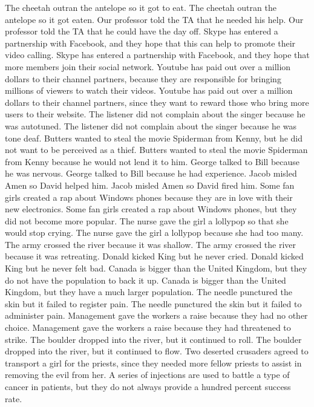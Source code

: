 \documentclass{article}
\begin{document}
\begin{enumerate}
	The cheetah outran the antelope so it got to eat.
	The cheetah outran the antelope so it got eaten.
	Our professor told the TA that he needed his help.
	Our professor told the TA that he could have the day off.
	Skype has entered a partnership with Facebook, and they hope that this can help to promote their video calling.
	Skype has entered a partnership with Facebook, and they hope that more members join their social network.
	Youtube has paid out over a million dollars to their channel partners, because they are responsible for bringing millions of viewers to watch their videos.
	Youtube has paid out over a million dollars to their channel partners, since they want to reward those who bring more users to their website.
	The listener did not complain about the singer because he was autotuned.
	The listener did not complain about the singer because he was tone deaf.
	Butters wanted to steal the movie Spiderman from Kenny, but he did not want to be perceived as a thief.
	Butters wanted to steal the movie Spiderman from Kenny because he would not lend it to him.
	George talked to Bill because he was nervous.
	George talked to Bill because he had experience.
	Jacob misled Amen so David helped him.
	Jacob misled Amen so David fired him.
	Some fan girls created a rap about Windows phones because they are in love with their new electronics.
	Some fan girls created a rap about Windows phones, but they did not become more popular.
	The nurse gave the girl a lollypop so that she would stop crying.
	The nurse gave the girl a lollypop because she had too many.
	The army crossed the river because it was shallow.
	The army crossed the river because it was retreating.
	Donald kicked King but he never cried.
	Donald kicked King but he never felt bad.
	Canada is bigger than the United Kingdom, but they do not have the population to back it up.
	Canada is bigger than the United Kingdom, but they have a much larger population.
	The needle punctured the skin but it failed to register pain.
	The needle punctured the skin but it failed to administer pain.
	Management gave the workers a raise because they had no other choice.
	Management gave the workers a raise because they had threatened to strike.
	The boulder dropped into the river, but it continued to roll.
	The boulder dropped into the river, but it continued to flow.
	Two deserted crusaders agreed to transport a girl for the priests, since they needed more fellow priests to assist in removing the evil from her.
	A series of injections are used to battle a type of cancer in patients, but they do not always provide a hundred percent success rate.

\end{enumerate}
\end{document}
